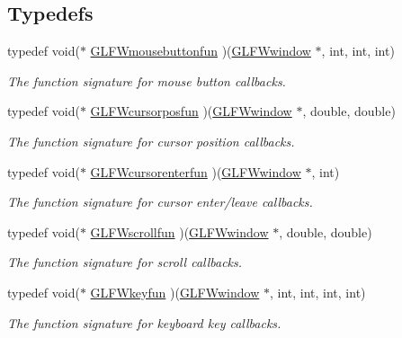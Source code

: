 \subsection*{Typedefs}
\begin{CompactItemize}
\item 
typedef void($\ast$ \hyperlink{group__input_g1e008c7a8751cea648c8f42cc91104cf}{GLFWmousebuttonfun} )(\hyperlink{group__window_g3c96d80d363e67d13a41b5d1821f3242}{GLFWwindow} $\ast$, int, int, int)
\begin{CompactList}\small\item\em The function signature for mouse button callbacks. \item\end{CompactList}\item 
typedef void($\ast$ \hyperlink{group__input_g592fbfef76d88f027cb1bc4c36ebd437}{GLFWcursorposfun} )(\hyperlink{group__window_g3c96d80d363e67d13a41b5d1821f3242}{GLFWwindow} $\ast$, double, double)
\begin{CompactList}\small\item\em The function signature for cursor position callbacks. \item\end{CompactList}\item 
typedef void($\ast$ \hyperlink{group__input_g762d898d9b0241d7e3e3b767c6cf318f}{GLFWcursorenterfun} )(\hyperlink{group__window_g3c96d80d363e67d13a41b5d1821f3242}{GLFWwindow} $\ast$, int)
\begin{CompactList}\small\item\em The function signature for cursor enter/leave callbacks. \item\end{CompactList}\item 
typedef void($\ast$ \hyperlink{group__input_g6228cdf94d28fbd3a9a1fbb0e5922a8a}{GLFWscrollfun} )(\hyperlink{group__window_g3c96d80d363e67d13a41b5d1821f3242}{GLFWwindow} $\ast$, double, double)
\begin{CompactList}\small\item\em The function signature for scroll callbacks. \item\end{CompactList}\item 
typedef void($\ast$ \hyperlink{group__input_g592dd1919f8a1dc7576b13cdd8b7b695}{GLFWkeyfun} )(\hyperlink{group__window_g3c96d80d363e67d13a41b5d1821f3242}{GLFWwindow} $\ast$, int, int, int, int)
\begin{CompactList}\small\item\em The function signature for keyboard key callbacks. \item\end{CompactList}\item 

\end{CompactItemize}

